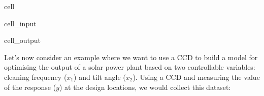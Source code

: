 \documentclass[letterpaper,10pt,english]{jupyterBook}
\begin{document}
\begin{sphinxuseclass}{cell}\begin{sphinxVerbatimInput}

\begin{sphinxuseclass}{cell_input}
\begin{sphinxVerbatim}[commandchars=\\\{\}]
   

    

 
\PYG{p}{[} \PYG{p}{]} \PYG{p}{[} \PYG{p}{]}  
\end{sphinxVerbatim}

\end{sphinxuseclass}\end{sphinxVerbatimInput}
\begin{sphinxVerbatimOutput}

\begin{sphinxuseclass}{cell_output}
\noindent{}

\end{sphinxuseclass}\end{sphinxVerbatimOutput}

\end{sphinxuseclass}
\sphinxAtStartPar
Let’s now consider an example where we want to use a CCD to build a model for optimising the output of a solar power plant based on two controllable variables: cleaning frequency (\(x_1\)) and tilt angle (\(x_2\)). Using a CCD and measuring the value of the response (\(y\)) at the design locations, we would collect this dataset:
\end{document}
